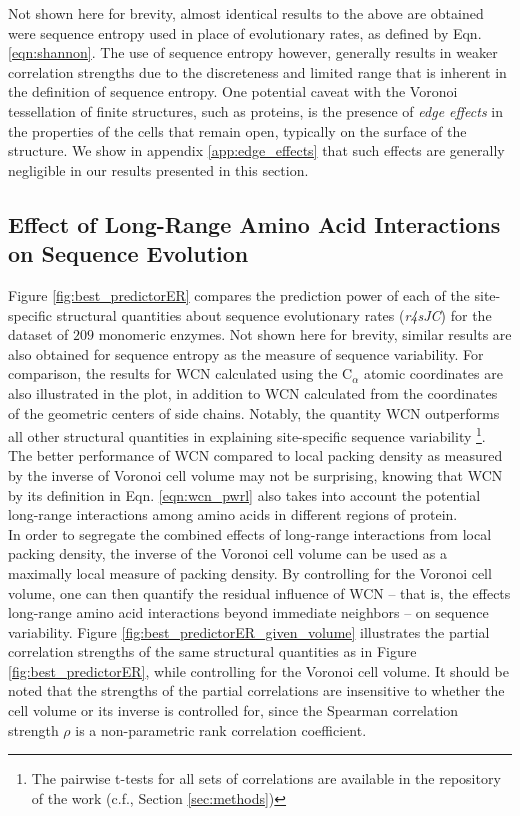 \documentclass[11pt]{article}
\begin{document}
    Not shown here for brevity, almost identical results to the above are obtained were sequence entropy used in place of evolutionary rates, as defined by Eqn. \ref{eqn:shannon}. The use of sequence entropy however, generally results in weaker correlation strengths due to the discreteness and limited range that is inherent in the definition of sequence entropy. One potential caveat with the Voronoi tessellation of finite structures, such as proteins, is the presence of {\it edge effects} in the properties of the cells that remain open, typically on the surface of the structure. We show in appendix \ref{app:edge_effects} that such effects are generally negligible in our results presented in this section. \\

    \subsection*{Effect of Long-Range Amino Acid Interactions on Sequence Evolution}
    \label{sec:long_range}
    Figure \ref{fig:best_predictorER} compares the prediction power of each of the site-specific structural quantities about sequence evolutionary rates ({\it r4sJC}) for the dataset of $209$ monomeric enzymes. Not shown here for brevity, similar results are also obtained for sequence entropy as the measure of sequence variability. For comparison, the results for WCN calculated using the C$_\alpha$ atomic coordinates are also illustrated in the plot, in addition to WCN calculated from the coordinates of the geometric centers of side chains. Notably, the quantity WCN outperforms all other structural quantities in explaining site-specific sequence variability \footnote{The pairwise t-tests for all sets of correlations are available in the repository of the work (c.f., Section \ref{sec:methods})}. The better performance of WCN compared to local packing density as measured by the inverse of Voronoi cell volume may not be surprising, knowing that WCN by its definition in Eqn. \ref{eqn:wcn_pwrl} also takes into account the potential long-range interactions among amino acids in different regions of protein. \\

    In order to segregate the combined effects of long-range interactions from local packing density, the inverse of the Voronoi cell volume can be used as a maximally local measure of packing density. By controlling for the Voronoi cell volume, one can then quantify the residual influence of WCN -- that is, the effects long-range amino acid interactions beyond immediate neighbors -- on sequence variability. Figure \ref{fig:best_predictorER_given_volume} illustrates the partial correlation strengths of the same structural quantities as in Figure \ref{fig:best_predictorER}, while controlling for the Voronoi cell volume. It should be noted that the strengths of the partial correlations are insensitive to whether the cell volume or its inverse is controlled for, since the Spearman correlation strength $\rho$ is a non-parametric rank correlation coefficient.
\end{document}
